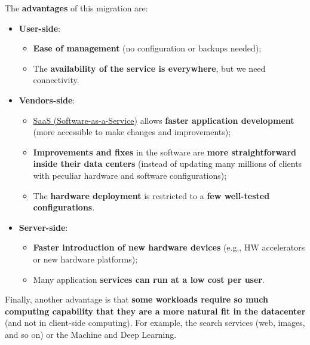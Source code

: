 \documentclass[a4paper]{article}
\newcommand{\example}[1]{\textcolor{Green4}{\textbf{#1}}}
\newcommand{\highspace}{\vspace{1.2em}\noindent}
\begin{document}
    \highspace
    The \example{advantages} of this migration are:
    \begin{itemize}
        \item \textbf{User-side}:
        \begin{itemize}
            \item \textbf{Ease of management} (no configuration or backups needed);
            
            \item The \textbf{availability of the service is everywhere}, but we need connectivity.
        \end{itemize}
        
        \item \textbf{Vendors-side}:
        \begin{itemize}
            \item \href{https://en.wikipedia.org/wiki/Software_as_a_service}{SaaS (Software-as-a-Service)} allows \textbf{faster application development} (more accessible to make changes and improvements);

            \item \textbf{Improvements and fixes} in the software are \textbf{more straightforward inside their data centers} (instead of updating many millions of clients with peculiar hardware and software configurations);
            
            \item The \textbf{hardware deployment} is restricted to a \textbf{few well-tested configurations}.
        \end{itemize} 

        \item \textbf{Server-side}:
        \begin{itemize}
            \item \textbf{Faster introduction of new hardware devices} (e.g., HW accelerators or new hardware platforms);

            \item Many application \textbf{services can run at a low cost per user}.
        \end{itemize}
    \end{itemize}
    Finally, another advantage is that \textbf{some workloads require so much computing capability that they are a more natural fit in the datacenter} (and not in client-side computing). For example, the search services (web, images, and so on) or the Machine and Deep Learning.
\end{document}
